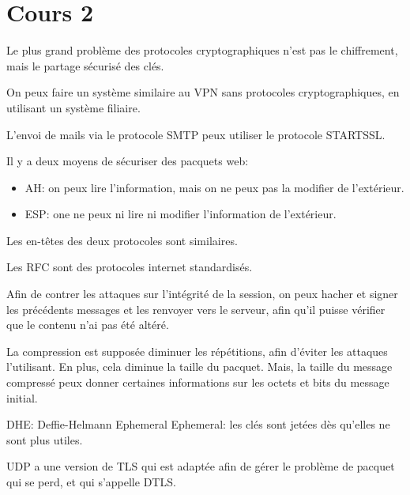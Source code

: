 \section{Cours 2}
Le plus grand probl\`eme des protocoles cryptographiques n'est pas le chiffrement, mais le partage s\'ecuris\'e des
cl\'es.

On peux faire un syst\`eme similaire au VPN sans protocoles cryptographiques, en utilisant un syst\`eme filiaire.

L'envoi de mails via le protocole SMTP peux utiliser le protocole STARTSSL.

Il y a deux moyens de s\'ecuriser des pacquets web:
\begin{itemize}
  \item AH: on peux lire l'information, mais on ne peux pas la modifier de l'ext\'erieur.
  \item ESP: one ne peux ni lire ni modifier l'information de l'ext\'erieur.
\end{itemize}
Les en-t\^etes des deux protocoles sont similaires.

Les RFC sont des protocoles internet standardis\'es.

Afin de contrer les attaques sur l'int\'egrit\'e de la session, on peux hacher et signer les pr\'ec\'edents messages et
les renvoyer vers le serveur, afin qu'il puisse v\'erifier que le contenu n'ai pas \'et\'e alt\'er\'e.

La compression est suppos\'ee diminuer les r\'ep\'etitions, afin d'\'eviter les attaques l'utilisant.
En plus, cela diminue la taille du pacquet.
Mais, la taille du message compress\'e peux donner certaines informations sur les octets et bits du message initial.

DHE: Deffie-Helmann Ephemeral
Ephemeral: les cl\'es sont jet\'ees d\`es qu'elles ne sont plus utiles.

UDP a une version de TLS qui est adapt\'ee afin de g\'erer le probl\`eme de pacquet qui se perd, et qui s'appelle DTLS.
